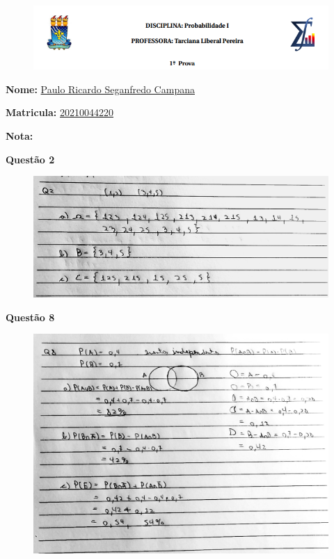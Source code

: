 \documentclass[12pt]{article}   %
\begin{document}
	
	\begin{figure}[h!]
		\includegraphics[scale=0.7]{ufpbde}
	\end{figure}
\par \textbf{Nome:} \underline{Paulo Ricardo Seganfredo Campana}
\par \textbf{Matricula:} \underline{20210044220}
\par \textbf{Nota:}
\vspace{+12pt}

\par \textbf{Questão 2}
	\begin{figure}[h!]
		\includegraphics[scale=0.4]{q2}
	\end{figure}
\vspace{+12pt}
\par \textbf{Questão 8}
	\begin{figure}[h!]
		\includegraphics[scale=0.5]{q8}
	\end{figure}
\vspace{+12pt}
\end{document}
